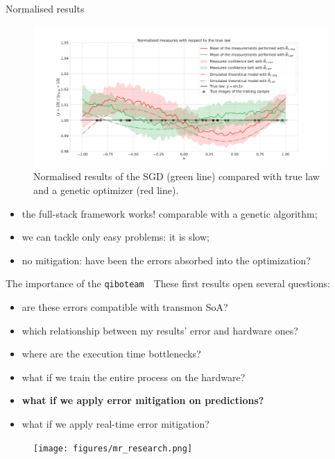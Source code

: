 \documentclass[8pt, xcolor={svgnames}, hyperref={colorlinks, linkcolor=black, citecolor=amethyst, urlcolor=amethyst}]{beamer}
\begin{document}
\begin{frame}{Normalised results \hfill \faCogs}

    \begin{figure}  
    \includegraphics[width=1\textwidth]{figures/ratio_plot.pdf}
    \caption{Normalised results of the SGD (green line) compared with true law 
    and a genetic optimizer (red line).}
    \end{figure}

    \pause
    \begin{itemize}[noitemsep]
    \item[\faThumbsUp] the full-stack framework works! comparable with a genetic algorithm;
    \pause
    \item[\faThumbsDown] we can tackle only easy problems: it is slow;
    \pause
    \item[\faMehO] no mitigation: have been the errors absorbed into the optimization?
    \end{itemize}

\end{frame}

\begin{frame}{The importance of the \texttt{qiboteam}}
\faArrowCircleRight\,\, These first results open several questions:
\begin{itemize}[noitemsep]
    \item[\footnotesize\faSquare] are these errors compatible with transmon SoA?
    \item[\footnotesize\faSquare] which relationship between my results' error and hardware ones?
    \item[\footnotesize\faSquare] where are the execution time bottlenecks?
    \item[\footnotesize\faSquare] what if we train 
    the entire process on the hardware?
    \item[\footnotesize\faSquare] \textcolor{amethyst}{\textbf{what if we apply 
    error mitigation on predictions?}}
    \item[\footnotesize\faSquare] what if we apply real-time error mitigation?
\end{itemize}
\begin{figure}
    \texttt{[image: figures/mr\_research.png]}
\end{figure}
\end{frame}
\end{document}
